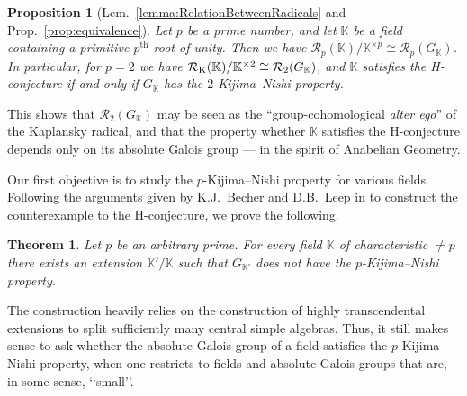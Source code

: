 \documentclass{amsart}
\newtheorem*{prop*}{Proposition}
\newtheorem{mainthm}{Theorem}
\theoremstyle{definition}
\theoremstyle{remark}
\newcommand{\KK}{\mathbb{K}}
\newcommand{\calR}{\mathcal{R}}
\begin{document}
\begin{prop*}[Lem.~\ref{lemma:RelationBetweenRadicals} and Prop.~\ref{prop:equivalence}]
    Let {$p$ be a prime number, and let} $\KK$ be a field containing a primitive $p^{\mathrm{th}}$-root of unity.
    Then we have { $\calR_{p}(\KK)/\KK^{\times p}\cong \calR_p(G_\KK)$. In particular, for $p=2$ we have} $\calR_{\rm K}(\KK)/\KK^{\times 2}\cong \calR_2(G_\KK)$, and $\KK$ satisfies the H-conjecture if and only if $G_\KK$ has the $2$-Kijima--Nishi property.
\end{prop*}
This shows that $\calR_2(G_\KK)$ may be seen as the ``group-cohomological {\sl alter ego}'' of the Kaplansky radical, and that the property whether $\KK$ satisfies the H-conjecture depends only on its absolute Galois group --- in the spirit of Anabelian Geometry. 

Our first objective is to study the $p$-Kijima--Nishi property for various fields. Following the arguments given by K.J.~Becher and D.B.~Leep in \cite{BecherLeep2014} to construct the counterexample to the H-conjecture, we prove the following.

\begin{mainthm}
    Let $p$ be an arbitrary prime. For every field $\KK$ of characteristic $\neq p$ there exists an extension $\KK'/\KK$ such that $G_{\KK'}$ does not have the $p$-Kijima--Nishi property.
\end{mainthm}

The construction heavily relies on the construction of highly transcendental extensions to split sufficiently many central simple algebras. 
Thus, it still makes sense to ask whether the absolute Galois group of a field satisfies the $p$-Kijima--Nishi property, when one restricts to fields and absolute Galois groups that are, in some sense, \lq\lq small\rq\rq.
\end{document}
